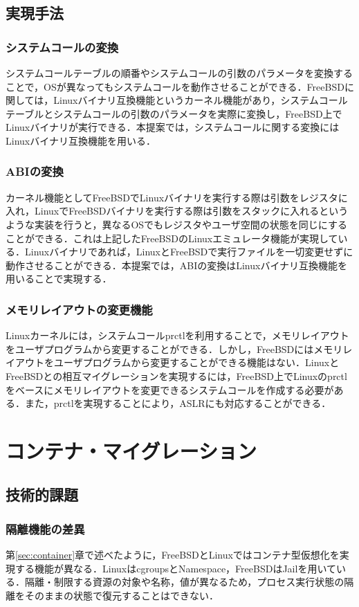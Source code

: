 \documentclass[11pt]{jarticle}
\begin{document}
\subsection{実現手法}
\subsubsection{システムコールの変換}
システムコールテーブルの順番やシステムコールの引数のパラメータを変換することで，OSが異なってもシステムコールを動作させることができる．FreeBSDに関しては，Linuxバイナリ互換機能\cite{linux-emu}というカーネル機能があり，システムコールテーブルとシステムコールの引数のパラメータを実際に変換し，FreeBSD上でLinuxバイナリが実行できる．本提案では，システムコールに関する変換にはLinuxバイナリ互換機能を用いる．

\subsubsection{ABIの変換}
カーネル機能としてFreeBSDでLinuxバイナリを実行する際は引数をレジスタに入れ，LinuxでFreeBSDバイナリを実行する際は引数をスタックに入れるというような実装を行うと，異なるOSでもレジスタやユーザ空間の状態を同じにすることができる．これは上記したFreeBSDのLinuxエミュレータ機能が実現している．Linuxバイナリであれば，LinuxとFreeBSDで実行ファイルを一切変更せずに動作させることができる．本提案では，ABIの変換はLinuxバイナリ互換機能を用いることで実現する．

\subsubsection{メモリレイアウトの変更機能}
Linuxカーネルには，システムコールprctlを利用することで，メモリレイアウトをユーザプログラムから変更することができる．しかし，FreeBSDにはメモリレイアウトをユーザプログラムから変更することができる機能はない．LinuxとFreeBSDとの相互マイグレーションを実現するには，FreeBSD上でLinuxのprctlをベースにメモリレイアウトを変更できるシステムコールを作成する必要がある．また，prctlを実現することにより，ASLRにも対応することができる．

\section{コンテナ・マイグレーション}
\label{sec:CM}
\subsection{技術的課題}
\subsubsection{隔離機能の差異}
第\ref{sec:container}章で述べたように，FreeBSDとLinuxではコンテナ型仮想化を実現する機能が異なる．LinuxはcgroupsとNamespace，FreeBSDはJailを用いている．隔離・制限する資源の対象や名称，値が異なるため，プロセス実行状態の隔離をそのままの状態で復元することはできない．
\end{document}
